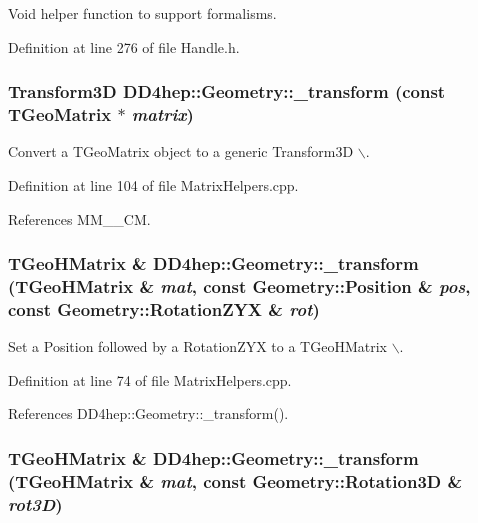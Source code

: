 Void helper function to support formalisms. 

Definition at line 276 of file Handle.h.\hypertarget{group___d_d4_h_e_p___g_e_o_m_e_t_r_y_ga7d9b7297bf0cee38d702a6e460a030a1}{
\subsubsection[{\_\-transform}]{\setlength{\rightskip}{0pt plus 5cm}Transform3D DD4hep::Geometry::\_\-transform (const TGeoMatrix $\ast$ {\em matrix})}}
\label{group___d_d4_h_e_p___g_e_o_m_e_t_r_y_ga7d9b7297bf0cee38d702a6e460a030a1}


Convert a TGeoMatrix object to a generic Transform3D $\backslash$. 

Definition at line 104 of file MatrixHelpers.cpp.

References MM\_\_\-CM.\hypertarget{group___d_d4_h_e_p___g_e_o_m_e_t_r_y_ga71170881a8a2e3803a68f7e55d237188}{
\subsubsection[{\_\-transform}]{\setlength{\rightskip}{0pt plus 5cm}TGeoHMatrix \& DD4hep::Geometry::\_\-transform (TGeoHMatrix \& {\em mat}, \/  const Geometry::Position \& {\em pos}, \/  const Geometry::RotationZYX \& {\em rot})}}
\label{group___d_d4_h_e_p___g_e_o_m_e_t_r_y_ga71170881a8a2e3803a68f7e55d237188}


Set a Position followed by a RotationZYX to a TGeoHMatrix $\backslash$. 

Definition at line 74 of file MatrixHelpers.cpp.

References DD4hep::Geometry::\_\-transform().\hypertarget{group___d_d4_h_e_p___g_e_o_m_e_t_r_y_ga249607824f27e539ae7a6d93d367afc6}{
\subsubsection[{\_\-transform}]{\setlength{\rightskip}{0pt plus 5cm}TGeoHMatrix \& DD4hep::Geometry::\_\-transform (TGeoHMatrix \& {\em mat}, \/  const Geometry::Rotation3D \& {\em rot3D})}}
\label{group___d_d4_h_e_p___g_e_o_m_e_t_r_y_ga249607824f27e539ae7a6d93d367afc6}


